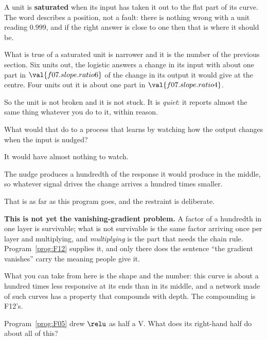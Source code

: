 \begin{fr}
A unit is \textbf{saturated} when its input has taken it out to the flat part
of its curve. The word describes a position, not a fault: there is nothing
wrong with a unit reading $\num{0.999}$, and if the right answer is close to
one then that is where it should be.

What is true of a saturated unit is narrower and it is the number of the
previous section. Six units out, the logistic answers a change in its input
with about one part in $\val{f07.slope.ratio6}$ of the change in its output it
would give at the centre. Four units out it is about one part in
$\val{f07.slope.ratio4}$.

So the unit is not broken and it is not stuck. It is \emph{quiet}: it reports
almost the same thing whatever you do to it, within reason.

What would that do to a process that learns by watching how the output changes
when the input is nudged?
\nextframe
\end{fr}

\begin{fr}
\begin{ansblock}
It would have almost nothing to watch.
\end{ansblock}

The nudge produces a hundredth of the response it would produce in the middle,
so whatever signal drives the change arrives a hundred times smaller.

\begin{rigourbox}
That is as far as this program goes, and the restraint is deliberate.

\textbf{This is not yet the vanishing-gradient problem.} A factor of a
hundredth in one layer is survivable; what is not survivable is the same
factor arriving once per layer and multiplying, and \emph{multiplying} is the
part that needs the chain rule. Program~\ref{prog:F12} supplies it, and only
there does the sentence \enquote{the gradient vanishes} carry the meaning
people give it.

What you can take from here is the shape and the number: this curve is about a
hundred times less responsive at its ends than in its middle, and a network
made of such curves has a property that compounds with depth. The compounding
is F12's.
\end{rigourbox}

Program~\ref{prog:F05} drew $\relu$ as half a V. What does its right-hand half
do about all of this?
\nextframe
\end{fr}


